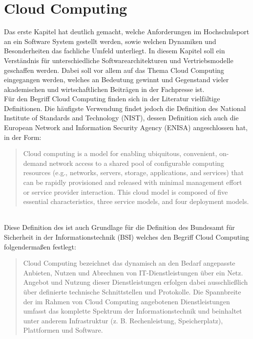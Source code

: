\chapter{Cloud Computing} 
\label{ch:cloud}
Das erste Kapitel hat deutlich gemacht, welche Anforderungen im Hochschulsport an ein Software System gestellt werden, sowie welchen Dynamiken und Besonderheiten das fachliche Umfeld unterliegt. In diesem Kapitel soll ein Verständnis für unterschiedliche Softwarearchitekturen und Vertriebsmodelle geschaffen werden. Dabei soll vor allem auf das Thema Cloud Computing eingegangen werden, welches an Bedeutung gewinnt und Gegenstand vieler akademischen und wirtschaftlichen Beiträgen in der Fachpresse ist. 
\\

Für den Begriff Cloud Computing finden sich in der Literatur vielfältige Definitionen. Die häufigste Verwendung findet jedoch die Definition des National Institute of Standards and Technology (NIST), dessen Definition sich auch die European Network and Information Security Agency (ENISA) angeschlossen hat, in der Form:

\begin{quote}
	Cloud computing is a model for enabling ubiquitous, convenient, on-demand network access to a shared pool of configurable computing resources (e.g., networks, servers, storage, applications, and services) that can be rapidly provisioned and released with minimal management effort or service provider interaction. This cloud model is composed of five essential characteristics, three service models, and four deployment models.
\end{quote} \cite*[vgl.][S.2]{Mell.2011}\\

Diese Definition des ist auch Grundlage für die Definition des Bundesamt für Sicherheit in der Informationstechnik (BSI) welches den Begriff Cloud Computing folgendermaßen festlegt:
\begin{quote}
	Cloud Computing bezeichnet das dynamisch an den Bedarf angepasste Anbieten, Nutzen und Abrechnen von IT-Dienstleistungen über ein Netz. Angebot und Nutzung dieser Dienstleistungen erfolgen dabei ausschließlich über definierte technische Schnittstellen und Protokolle. Die Spannbreite der im Rahmen von Cloud Computing angebotenen Dienstleistungen umfasst das komplette Spektrum der Informationstechnik und beinhaltet unter anderem Infrastruktur (z. B. Rechenleistung, Speicherplatz), Plattformen und Software.
\end{quote} \cite*[vgl.][]{BundesamtfurSicherheitinderInformationstechnik.}

